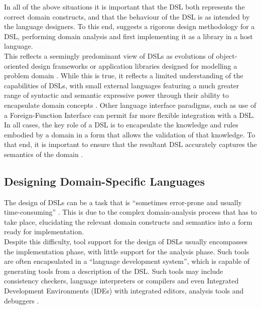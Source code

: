 In all of the above situations it is important that the DSL both represents the correct domain constructs, and that the behaviour of the DSL is as intended by the language designers.
To this end, \citet{van2000domain} suggests a rigorous design methodology for a DSL, performing domain analysis and first implementing it as a library in a host language. \\

This reflects a seemingly predominant view of DSLs as evolutions of object-oriented design frameworks or application libraries designed for modelling a problem domain \citep{van2000domain,Mernik:2005:DDL:1118890.1118892}. 
While this is true, it reflects a limited understanding of the capabilities of DSLs, with small external languages featuring a much greater range of syntactic and semantic expressive power through their ability to encapsulate domain concepts \citep{fowler2010domain}.
Other language interface paradigms, such as use of a Foreign-Function Interface can permit far more flexible integration with a DSL.\\

In all cases, the key role of a DSL is to encapsulate the knowledge and rules embodied by a domain in a form that allows the validation of that knowledge. 
To that end, it is important to ensure that the resultant DSL accurately captures the semantics of the domain \citep{fowler2010domain}.


\subsection{Designing Domain-Specific Languages} %
\label{sub:designing_domain_specific_languages}
The design of DSLs can be a task that is ``sometimes error-prone and usually time-consuming'' \citep{karsai2014design}. 
This is due to the complex domain-analysis process that has to take place, elucidating the relevant domain constructs and semantics into a form ready for implementation. \\

Despite this difficulty, tool support for the design of DSLs usually encompasses the implementation phase, with little support for the analysis phase. 
Such tools are often encapsulated in a ``language development system'', which is capable of generating tools from a description of the DSL. 
Such tools may include consistency checkers, language interpreters or compilers and even Integrated Development Environments (IDEs) with integrated editors, analysis tools and debuggers \citep[pg. 19-20]{Mernik:2005:DDL:1118890.1118892}. \\

